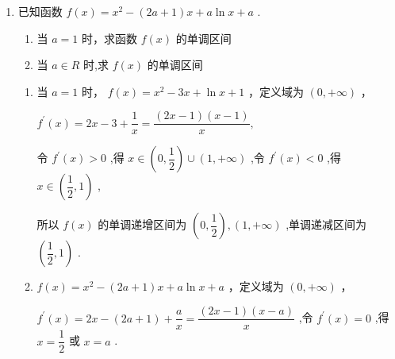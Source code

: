 \begin{enumerate}
\begin{enumerate}
\begin{jieda}
\begin{enumerate}
                当 $x \leq  0$ 时， $0 < {{e}}^{x} \leq  1,\sin x \leq  1$ ，
                
                所以 ${f}^{\prime }\left( x\right)  = {{e}}^{x} - 2 + \sin x \leq  0$ 恒成立,
                
                所以 $f\left( x\right)$ 在 $( - \infty ,0\rbrack$ 上的单调递减.
            \end{enumerate}
        \end{jieda}
        
        \item 已知函数 $f\left( x\right)  = {x}^{2} - \left( {{2a} + 1}\right) x + a\ln x + a$ .
        \begin{enumerate}
            \item 当 $a = 1$ 时，求函数 $f\left( x\right)$ 的单调区间
            \item 当 $a \in  {R}$ 时,求 $f\left( x\right)$ 的单调区间
        \end{enumerate}
        \begin{jieda}
            \begin{enumerate}
                \item 当 $a = 1$ 时， $f\left( x\right)  = {x}^{2} - {3x} + \ln x + 1$ ，定义域为 $\left( {0, + \infty }\right)$ ，
                
                ${f}^{\prime }\left( x\right)  = {2x} - 3 + \dfrac{1}{x} = \dfrac{\left( {{2x} - 1}\right) \left( {x - 1}\right) }{x},$
                
                令 ${f}^{\prime }\left( x\right)  > 0$ ,得 $x \in  \left( {0,\dfrac{1}{2}}\right)  \cup  \left( {1, + \infty }\right)$ ,令 ${f}^{\prime }\left( x\right)  < 0$ ,得 $x \in  \left( {\dfrac{1}{2},1}\right)$ ,
                
                所以 $f\left( x\right)$ 的单调递增区间为 $\left( {0,\dfrac{1}{2}}\right) ,\left( {1, + \infty }\right)$ ,单调递减区间为 $\left( {\dfrac{1}{2},1}\right)$ .

                \item $f\left( x\right)  = {x}^{2} - \left( {{2a} + 1}\right) x + a\ln x + a$ ，定义域为 $\left( {0, + \infty }\right)$ ，
                
                ${f}^{\prime }\left( x\right)  = {2x} - \left( {{2a} + 1}\right)  + \dfrac{a}{x} = \dfrac{\left( {{2x} - 1}\right) \left( {x - a}\right) }{x}$ ,令 ${f}^{\prime }\left( x\right)  = 0$ ,得 $x = \dfrac{1}{2}$ 或 $x = a$ .

\end{enumerate}
\end{jieda}
\end{enumerate}
\end{enumerate}

